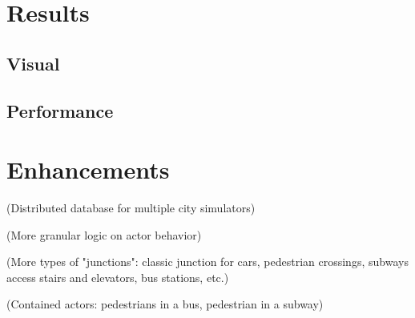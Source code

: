 \documentclass[conference]{IEEEtran}
\begin{document}
\section{Results}
\label{sec:results}

\subsection{Visual}

\subsection{Performance}

\section{Enhancements}
\label{sec:enhancements}
(Distributed database for multiple city simulators)

(More granular logic on actor behavior)

(More types of "junctions": classic junction for cars, pedestrian crossings, subways access stairs and elevators, bus stations, etc.)

(Contained actors: pedestrians in a bus, pedestrian in a subway)


\vspace{12pt}
\end{document}
